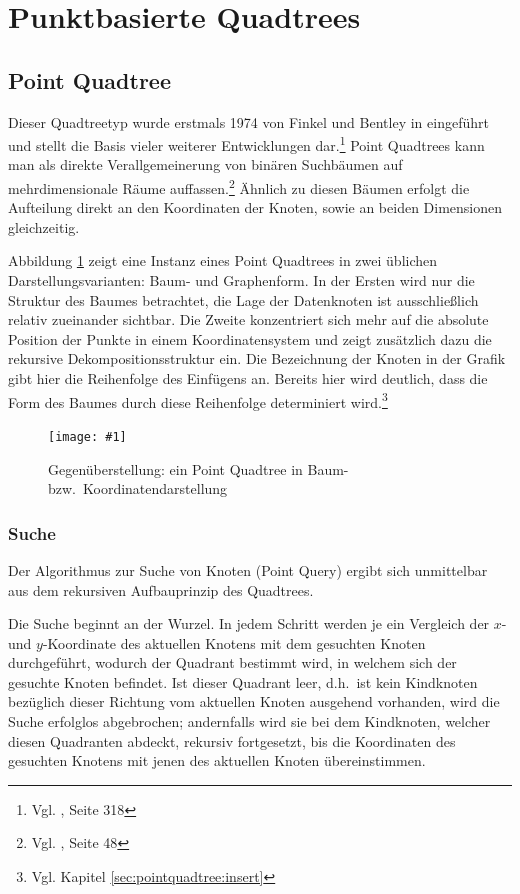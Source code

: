 \documentclass[%
			paper=a4,%
			DIV12,
			liststotoc,
			bibtotoc,
			draft=false,%
			titlepage,
			numbers=noendperiod
			]{scrartcl}
\newcommand{\zit}[3]{#1 \cite{#2}, #3}
\newcommand{\footzit}[3]{\footnote{\zit{#1}{#2}{#3}}}
\newcommand{\myfig}[5] {
 \begin{figure}[tbph]
	 \centering
	 \texttt{[image: \#1]}
	 \caption[#4]{#5}
	 \label{fig:#2}
 \end{figure}
}
\begin{document}
\section{Punktbasierte Quadtrees}
\label{sec:pointbased}
\subsection{Point Quadtree}
Dieser Quadtreetyp wurde erstmals 1974 von Finkel und Bentley in \cite{DBLP:journals/acta/FinkelB74} eingeführt und stellt die Basis vieler weiterer Entwicklungen dar.\footzit{Vgl.}{compgeom:2000}{Seite 318}
Point Quadtrees kann man als direkte Verallgemeinerung von binären Suchbäumen auf mehrdimensionale Räume auffassen.\footzit{Vgl.}{Samet90}{Seite 48}
Ähnlich zu diesen Bäumen erfolgt die Aufteilung direkt an den Koordinaten der Knoten, sowie an beiden Dimensionen gleichzeitig. 


Abbildung \ref{fig:pointquadtree} zeigt eine Instanz eines Point Quadtrees in zwei üblichen Darstellungsvarianten: Baum- und Graphenform.
In der Ersten wird nur die Struktur des Baumes betrachtet, die Lage der Datenknoten ist ausschließlich relativ zueinander sichtbar.
Die Zweite konzentriert sich mehr auf die absolute Position der Punkte in einem Koordinatensystem und zeigt zusätzlich dazu die rekursive Dekompositionsstruktur ein.
Die Bezeichnung der Knoten in der Grafik gibt hier die Reihenfolge des Einfügens an. Bereits hier wird deutlich, dass die Form des Baumes durch diese Reihenfolge determiniert wird.\footnote{Vgl. Kapitel \ref{sec:pointquadtree:insert}}
\myfig{img/pointquadtree-ins7+tree-trimmed}{pointquadtree}{width=.9\textwidth}{Point Quadtree}{Gegenüberstellung: ein Point Quadtree in Baum- bzw.\ Koordinatendarstellung}

\subsubsection{Suche}
\label{sec:pointquadtree-suche}
Der Algorithmus zur Suche von Knoten (Point Query) ergibt sich unmittelbar aus dem rekursiven Aufbauprinzip des Quadtrees. 

Die Suche beginnt an der Wurzel. In jedem Schritt werden je ein Vergleich der $x$- und $y$-Koordinate des aktuellen Knotens mit dem gesuchten Knoten durchgeführt, wodurch der Quadrant bestimmt wird, in welchem sich der gesuchte Knoten befindet.
Ist dieser Quadrant leer, d.h.\ ist kein Kindknoten bezüglich dieser Richtung vom aktuellen Knoten ausgehend vorhanden, wird die Suche erfolglos abgebrochen; andernfalls wird sie bei dem Kindknoten, welcher diesen Quadranten abdeckt, rekursiv fortgesetzt, bis die Koordinaten des gesuchten Knotens mit jenen des aktuellen Knoten übereinstimmen.
\end{document}
